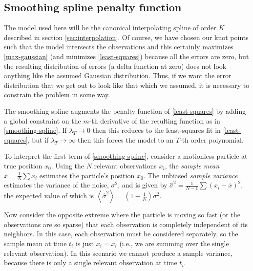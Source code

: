 \documentclass{ametsoc}
\begin{document}
\subsection{Smoothing spline penalty function}
\label{smoothing_spline_penalty_function}

The model used here will be the canonical interpolating spline of order $K$ described in section \ref{sec:interpolation}. Of course, we have chosen our knot points such that the model intersects the observations and this certainly maximizes \eqref{max-gaussian} (and minimizes \eqref{least-squares}) because all the errors are zero, but the resulting distribution of errors (a delta function at zero) does not look anything like the assumed Gaussian distribution. Thus, if we want the error distribution that we get out to look like that which we assumed, it is necessary to constrain the problem in some way.

The smoothing spline augments the penalty function of \eqref{least-squares} by adding a global constraint on the $m$-th derivative of the resulting function as in \eqref{smoothing-spline}.
If $\lambda_T \rightarrow 0$ then this reduces to the least-squares fit in \eqref{least-squares}, but if $\lambda_T \rightarrow \infty$ then this forces the model to an $T$-th order polynomial.

To interpret the first term of \eqref{smoothing-spline}, consider a motionless particle at true position $x_0$. Using the $N$ relevant observations $x_i$, the \emph{sample mean} $\bar{x} = \frac{1}{N} \sum x_i$ estimates the particle's position $x_0$. The unbiased \emph{sample variance} estimates the variance of the noise, $\sigma^2$, and is given by $\hat{\sigma}^2=\frac{1}{N-1} \sum (x_i-\bar{x})^2$, the expected value of which is $\left\langle \hat{\sigma}^2 \right\rangle = \left(1-\frac{1}{N}\right)\sigma^2$.

Now consider the opposite extreme where the particle is moving so fast (or the observations are so sparse) that each observation is completely independent of its neighbors. In this case, each observation must be considered separately, so the sample mean at time $t_i$ is just $\bar{x}_i = x_i$ (i.e., we are summing over the single relevant observation). In this scenario we cannot produce a sample variance, because there is only a single relevant observation at time $t_i$.
\end{document}
